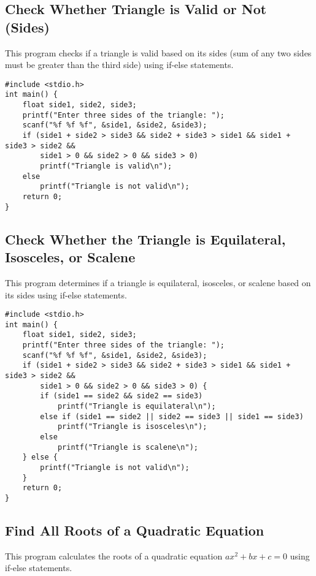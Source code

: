 \documentclass[a4paper,12pt]{article}
\begin{document}
\newpage

\subsection{Check Whether Triangle is Valid or Not (Sides)}
This program checks if a triangle is valid based on its sides (sum of any two sides must be greater than the third side) using if-else statements.

\begin{lstlisting}[caption={Check Whether Triangle is Valid or Not (Sides)}]
#include <stdio.h>
int main() {
    float side1, side2, side3;
    printf("Enter three sides of the triangle: ");
    scanf("%f %f %f", &side1, &side2, &side3);
    if (side1 + side2 > side3 && side2 + side3 > side1 && side1 + side3 > side2 &&
        side1 > 0 && side2 > 0 && side3 > 0)
        printf("Triangle is valid\n");
    else
        printf("Triangle is not valid\n");
    return 0;
}
\end{lstlisting}

\newpage

\subsection{Check Whether the Triangle is Equilateral, Isosceles, or Scalene}
This program determines if a triangle is equilateral, isosceles, or scalene based on its sides using if-else statements.

\begin{lstlisting}[caption={Check Whether the Triangle is Equilateral, Isosceles, or Scalene}]
#include <stdio.h>
int main() {
    float side1, side2, side3;
    printf("Enter three sides of the triangle: ");
    scanf("%f %f %f", &side1, &side2, &side3);
    if (side1 + side2 > side3 && side2 + side3 > side1 && side1 + side3 > side2 &&
        side1 > 0 && side2 > 0 && side3 > 0) {
        if (side1 == side2 && side2 == side3)
            printf("Triangle is equilateral\n");
        else if (side1 == side2 || side2 == side3 || side1 == side3)
            printf("Triangle is isosceles\n");
        else
            printf("Triangle is scalene\n");
    } else {
        printf("Triangle is not valid\n");
    }
    return 0;
}
\end{lstlisting}

\newpage

\subsection{Find All Roots of a Quadratic Equation}
This program calculates the roots of a quadratic equation \(ax^2 + bx + c = 0\) using if-else statements.
\end{document}
